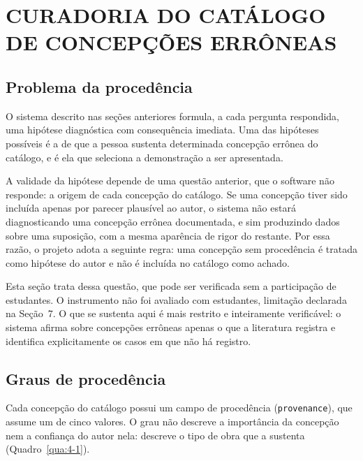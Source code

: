
\chapter{\texorpdfstring{\mbox{CURADORIA} \mbox{DO} \mbox{CATÁLOGO} \mbox{DE} \mbox{CONCEPÇÕES} \mbox{ERRÔNEAS}}{CURADORIA DO CATÁLOGO DE CONCEPÇÕES ERRÔNEAS}}\label{cap:4}

\section{Problema da procedência}

O sistema descrito nas seções anteriores formula, a cada pergunta respondida, uma hipótese diagnóstica com consequência imediata. Uma das hipóteses possíveis é a de que a pessoa sustenta determinada concepção errônea do catálogo, e é ela que seleciona a demonstração a ser apresentada.

A validade da hipótese depende de uma questão anterior, que o software não responde: a origem de cada concepção do catálogo. Se uma concepção tiver sido incluída apenas por parecer plausível ao autor, o sistema não estará diagnosticando uma concepção errônea documentada, e sim produzindo dados sobre uma suposição, com a mesma aparência de rigor do restante. Por essa razão, o projeto adota a seguinte regra: uma concepção sem procedência é tratada como hipótese do autor e não é incluída no catálogo como achado.

Esta seção trata dessa questão, que pode ser verificada sem a participação de estudantes. O instrumento não foi avaliado com estudantes, limitação declarada na Seção~7. O que se sustenta aqui é mais restrito e inteiramente verificável: o sistema afirma sobre concepções errôneas apenas o que a literatura registra e identifica explicitamente os casos em que não há registro.

\section{Graus de procedência}

Cada concepção do catálogo possui um campo de procedência (\texttt{provenance}), que assume um de cinco valores. O grau não descreve a importância da concepção nem a confiança do autor nela: descreve o tipo de obra que a sustenta (Quadro~\ref{qua:4-1}).

